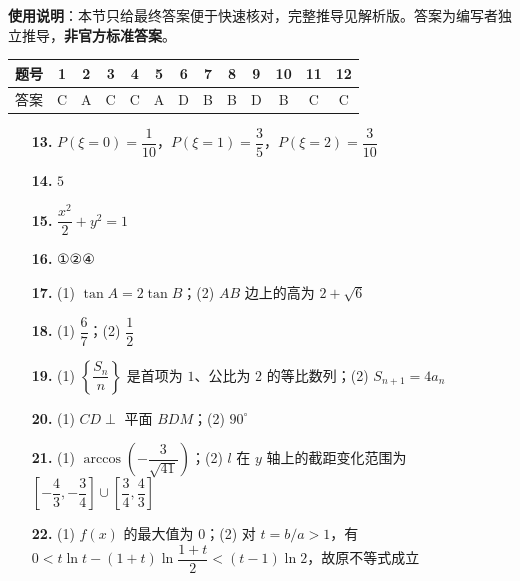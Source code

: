 
\begin{gknotice}
\textbf{使用说明}：本节只给最终答案便于快速核对，完整推导见解析版。答案为编写者独立推导，\textbf{非官方标准答案}。
\end{gknotice}

\begin{center}\begin{tabular}{ccccccccccccc}
\toprule
题号 & 1 & 2 & 3 & 4 & 5 & 6 & 7 & 8 & 9 & 10 & 11 & 12 \\
\midrule
答案 & C & A & C & C & A & D & B & B & D & B & C & C \\
\bottomrule
\end{tabular}\end{center}

\begin{itemize}[leftmargin=2.6em]
  \item[\textbf{13.}] $P(\xi=0)=\dfrac1{10}$，$P(\xi=1)=\dfrac35$，$P(\xi=2)=\dfrac3{10}$
  \item[\textbf{14.}] $5$
  \item[\textbf{15.}] $\dfrac{x^2}{2}+y^2=1$
  \item[\textbf{16.}] ①②④
\end{itemize}

\begin{itemize}[leftmargin=2.6em]
  \item[\textbf{17.}] (1) $\tan A=2\tan B$；(2) $AB$ 边上的高为 $2+\sqrt6$
  \item[\textbf{18.}] (1) $\dfrac67$；(2) $\dfrac12$
  \item[\textbf{19.}] (1) $\left\{\dfrac{S_n}{n}\right\}$ 是首项为 $1$、公比为 $2$ 的等比数列；(2) $S_{n+1}=4a_n$
  \item[\textbf{20.}] (1) $CD\perp$ 平面 $BDM$；(2) $90^\circ$
  \item[\textbf{21.}] (1) $\arccos\left(-\dfrac3{\sqrt{41}}\right)$；(2) $l$ 在 $y$ 轴上的截距变化范围为 $\left[-\dfrac43,-\dfrac34\right]\cup\left[\dfrac34,\dfrac43\right]$
  \item[\textbf{22.}] (1) $f(x)$ 的最大值为 $0$；(2) 对 $t=b/a>1$，有 $0<t\ln t-(1+t)\ln\dfrac{1+t}{2}<(t-1)\ln2$，故原不等式成立
\end{itemize}
